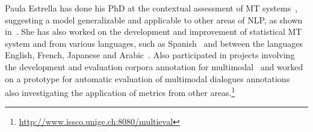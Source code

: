 
Paula Estrella has done his PhD at the contextual assessment of MT
systems~\cite{estr:impr08,estr:femt09}, suggesting a model generalizable and
applicable to other areas of NLP, as shown in~\cite{Miller2008}. She has also
worked on the development and improvement of
statistical MT system and from various languages, such as
Spanish~\cite{estr:expe05} and between the languages English, French, Japanese
and Arabic~\cite{rayner-EtAl:2009:GEAF}. Also participated in projects involving
the development and evaluation
corpora annotation for multimodal~\cite{pope:estr07} and worked on
a prototype for automatic evaluation of multimodal dialogues
annotations~\cite{multieval} also investigating the application of metrics from
other areas.\footnote{\url{http://www.issco.unige.ch:8080/multieval}}


